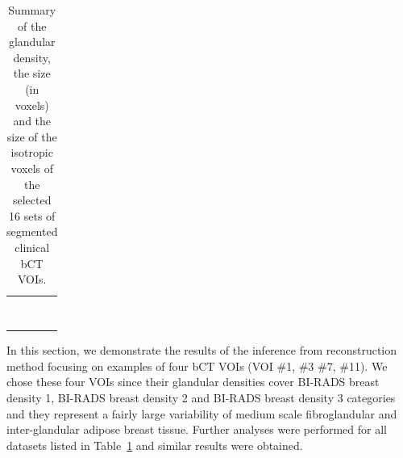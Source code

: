 \documentclass[journal]{IEEEtran}
\begin{document}
\begin{table}[!htb]
\begin{center}
\begin{tabular}{ m{1cm} m{1.3cm} m{2.6cm} m{1.8cm}}
      \centering{\#9}
        & \centering{25.7\%}
      & \centering{$97 \times 97 \times 97$}
      & \centering{$\SI{0.361}{\mm}$}
        \tabularnewline%

      \centering{\#10}
        & \centering{13.9\%}
      & \centering{$101 \times 101 \times 101$}
      & \centering{$\SI{0.349}{\mm}$}
        \tabularnewline%

      \centering{\#11}
        & \centering{14.5\%}
      & \centering{$128 \times 128 \times 128$}
      & \centering{$\SI{0.275}{\mm}$}
        \tabularnewline%

      \centering{\#12}
        & \centering{09.8\%}
      & \centering{$87 \times 87 \times 87$}
      & \centering{$\SI{0.405}{\mm}$}
        \tabularnewline%

      \centering{\#13}
        & \centering{27.1\%}
      & \centering{$107 \times 107 \times 107$}
      & \centering{$\SI{0.329}{\mm}$}
        \tabularnewline%

      \centering{\#14}
        & \centering{25.0\%}
      & \centering{$87 \times 87 \times 87$}
      & \centering{$\SI{0.405}{\mm}$}
        \tabularnewline%

      \centering{\#15}
        & \centering{20.5\%}
      & \centering{$124 \times 124 \times 124$}
      & \centering{$\SI{0.283}{\mm}$}
        \tabularnewline%

      \centering{\#16}
        & \centering{17.2\%}
      & \centering{$126 \times 126 \times 126$}
      & \centering{$\SI{0.279}{\mm}$}
        \tabularnewline%

      \bottomrule

    \end{tabular}
    \caption{Summary of the glandular density, the size (in voxels)
      and the size of the isotropic voxels of the selected 16 sets of
      segmented clinical bCT VOIs.}
    \label{tab:summary-info-extract}
  \end{center}
\end{table}

In this section, we demonstrate the results of the inference from
reconstruction method focusing on examples of four bCT VOIs (VOI \#1,
\#3 \#7, \#11). We chose these four VOIs since their glandular
densities cover BI-RADS breast density 1, BI-RADS breast density 2 and
BI-RADS breast density 3 categories and they represent a fairly large
variability of medium scale fibroglandular and inter-glandular adipose
breast tissue. Further analyses were performed for all datasets listed
in Table~\ref{tab:summary-info-extract} and similar results were
obtained.
\end{document}
